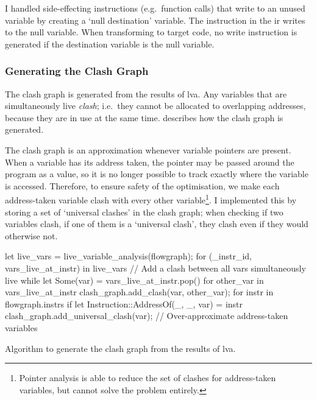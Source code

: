 \documentclass[00-main.tex]{subfiles}
\begin{document}
I handled side-effecting instructions (e.g.~function calls) that write to an unused variable by creating a `null destination' variable.
The instruction in the \gls{ir} writes to the null variable.
When transforming to target code, no write instruction is generated if the destination variable is the null variable.


\subsubsection{Generating the Clash Graph}\label{sec:impl:generating clash graph}

The clash graph is generated from the results of \gls{lva}.
Any variables that are simultaneously live \emph{clash}; i.e.\ they cannot be allocated to overlapping addresses, because they are in use at the same time.
 describes how the clash graph is generated.

The clash graph is an approximation whenever variable pointers are present.
When a variable has its address taken, the pointer may be passed around the program as a value, so it is no longer possible to track exactly where the variable is accessed.
Therefore, to ensure safety of the optimisation, we make each address-taken variable clash with every other variable\footnote{Pointer analysis is able to reduce the set of clashes for address-taken variables, but cannot solve the problem entirely.}.
I implemented this by storing a set of `universal clashes' in the clash graph; when checking if two variables clash, if one of them is a `universal clash', they clash even if they would otherwise not.

\begin{listing}[t]
  \begin{RustListing}
    let live_vars = live_variable_analysis(flowgraph);
    for (_instr_id, vars_live_at_instr) in live_vars {
        // Add a clash between all vars simultaneously live
        while let Some(var) = vars_live_at_instr.pop() {
            for other_var in vars_live_at_instr {
                clash_graph.add_clash(var, other_var);
            }
        }
    }
    for instr in flowgraph.instrs {
        if let Instruction::AddressOf(_, _, var) = instr {
            clash_graph.add_universal_clash(var); // Over-approximate address-taken variables
        }
    }
  \end{RustListing}
  \caption{Algorithm to generate the clash graph from the results of \acrlong{lva}.}
  \label{lst:clash graph generation}
\end{listing}
\end{document}

